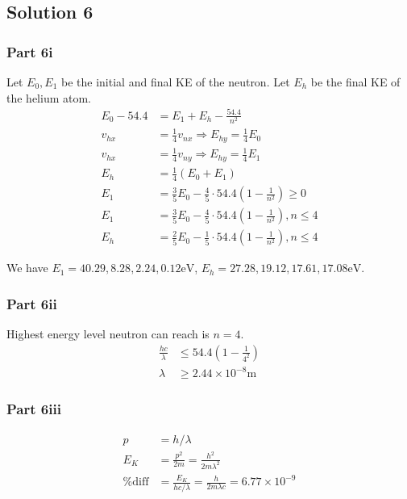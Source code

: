 \documentclass{article}
\begin{document}
\subsection{Solution 6}
\subsubsection{Part 6i}
Let $E_0, E_1$ be the initial and final KE of the neutron. Let $E_h$ be the final KE of the helium atom.
\begin{align}
    E_0 - 54.4 &= E_1 + E_h - \frac{54.4}{n^{2}} \\ 
    v_{hx} &= \frac{1}{4} v_{nx} \Rightarrow E_{hy} = \frac{1}{4} E_0 \\
    v_{hx} &= \frac{1}{4} v_{ny} \Rightarrow E_{hy} = \frac{1}{4} E_1 \\
    E_h &= \frac{1}{4}(E_0 + E_1) \\
    E_1 &= \frac{3}{5} E_0 - \frac{4}{5}\cdot 54.4\left(1-\frac{1}{n^{2}}\right) \geq 0 \\
    E_1 &= \frac{3}{5} E_0 - \frac{4}{5}\cdot 54.4\left(1-\frac{1}{n^{2}}\right), n \leq 4 \\
    E_h &= \frac{2}{5} E_0 - \frac{1}{5}\cdot 54.4\left(1-\frac{1}{n^{2}}\right), n \leq 4
\end{align}

We have $E_1=40.29, 8.28, 2.24, 0.12 \mathrm{eV}$, $E_h = 27.28, 19.12, 17.61, 17.08 \mathrm{eV}$.

\subsubsection{Part 6ii}
Highest energy level neutron can reach is $n=4$. 
\begin{align}
    \frac{hc}{\lambda} &\leq 54.4\left(1-\frac{1}{4^{2}}\right) \\
    \lambda & \geq 2.44\times10^{-8} \mathrm{m}
\end{align}

\subsubsection{Part 6iii}
\begin{align}
    p &= h/\lambda \\
    E_K &= \frac{p^2}{2m} = \frac{h^2}{2m\lambda^2} \\
    \mathrm{\% diff} &= \frac{E_K}{hc/\lambda} = \frac{h}{2m\lambda c} = 6.77\times 10^{-9}
\end{align}
\end{document}
